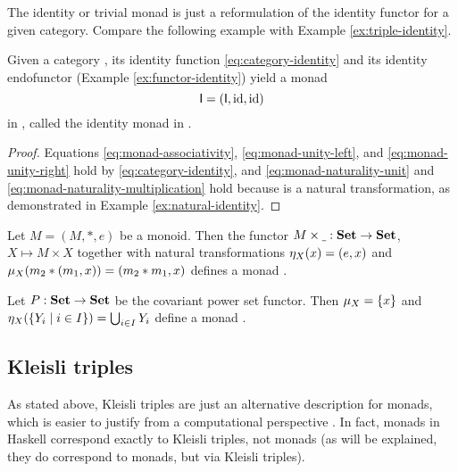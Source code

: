 \begin{example}
  \label{ex:monad-identity}

  The identity or trivial monad is just a reformulation of the
  identity functor for a given category. Compare the following example
  with Example \ref{ex:triple-identity}.

  Given a category , its identity function
  \eqref{eq:category-identity} and its identity endofunctor (Example
  \ref{ex:functor-identity}) yield a monad
  \begin{equation*}
    \mathsf{I} = (\mathsf{I}, \operatorname{id}, \operatorname{id})
  \end{equation*}
  in , called the identity monad in .

  \begin{proof}

    Equations \eqref{eq:monad-associativity},
    \eqref{eq:monad-unity-left}, and \eqref{eq:monad-unity-right} hold
    by \eqref{eq:category-identity}, and
    \eqref{eq:monad-naturality-unit} and
    \eqref{eq:monad-naturality-multiplication} hold because \nat{\id}
    is a natural transformation, as demonstrated in Example
    \ref{ex:natural-identity}.

  \end{proof}

\end{example}

\begin{example}

  Let $M = (M, *, e)$ be a monoid. Then the functor $M \times
  \underline{~} : \mathbf{Set} \to \mathbf{Set}$, $X \mapsto M \times X$ together with
  natural transformations $\eta_{X}(x) = (e, x)$ and
  $\mu_{X}(m_2 * (m_1, x)) = (m_2 * m_1, x)$ defines a monad
  \parencite[596]{poigne-1992}.

\end{example}

\begin{example}
  Let $P : \mathbf{Set} \to \mathbf{Set}$ be the covariant power set functor. Then
  $\mu_{X} = \{ x \}$ and $\eta_{X}(\{Y_i \mid i \in I\})
  = \bigcup_{i \in I} Y_i$ define a monad
  \parencite[596]{poigne-1992}.
\end{example}

\subsection*{Kleisli triples}

As stated above, Kleisli triples are just an alternative description
for monads, which is easier to justify from a computational
perspective \parencite[60]{moggi-1991}. In fact, monads in Haskell
correspond exactly to Kleisli triples, not monads (as will be
explained, they do correspond to monads, but via Kleisli triples).

